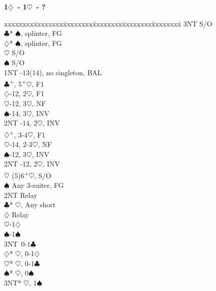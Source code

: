 \documentclass[10pt]{article}
\renewcommand{\c}{$\clubsuit$}
\renewcommand{\d}{$\diamondsuit$}
\newcommand{\h}{$\heartsuit$}
\newcommand{\s}{$\spadesuit$}
\newcommand{\p}{\textsuperscript{+}}
\newenvironment{bidtable}[1][]
{\textbf{#1}
  \begin{adjustwidth}{1em}{}
    \addvspace{2pt}
    \begin{tabbing}
      xxxxxxxx\=xxxxxxxx\=xxxxxxxx\=xxxxxxxx\=xxxxxxxx\=xxxxxxxx\=\kill}
{\end{tabbing}\end{adjustwidth}\bigskip}%
\begin{document}
\begin{multicols*}{2}
\begin{bidtable}[1\d\ - 1\h\ - ?]
     \> 3NT  \> S/O                                     \\
     \c* {}\s, splinter, FG                       \\
     \d* {}\s, splinter, FG                       \\
     \h  \> S/O                                     \\
     \s  \> S/O                                     \\
1NT  -13(14), no singleton, BAL                    \\
     \c  {}\p, 5\p\h, F1                          \\
     \>      \d {}-12, 2\h, F1                   \\
     \>      \h {}-12, 3\h, NF                   \\
     \>      \s {}-14, 3\h, INV                  \\
     \>      \> 2NT -14, 2\h, INV                  \\
     \d  {}\p, 3-4\h, F1                          \\
     \>      \h {}-14, 2-3\h, NF                 \\
     \>      \s {}-12, 3\h, INV                  \\
     \>      \> 2NT -12, 2\h, INV                  \\
     \h  \> (5)6\p\h, S/O                           \\
     \s  \> Any 3-suiter, FG                        \\
     \>      \> 2NT \> Relay                            \\
     \>      \>     \c* {}\h, Any short           \\
     \>      \>     \>      \d \> Relay             \\
     \>      \>     \>      \>     \h{}-1\d      \\
     \>      \>     \>      \>     \s{}-1\s      \\
     \>      \>     \>      \>     \> 3NT\ 0-1\c      \\
     \>      \>     \d* {}\h, 0-1\d               \\
     \>      \>     \h* {}\h, 0-1\c               \\
     \>      \>     \s* {}\h, 0\s                 \\
     \>      \>     \> 3NT* \h, 1\s                 \\

\end{bidtable}
\end{multicols*}
\end{document}

